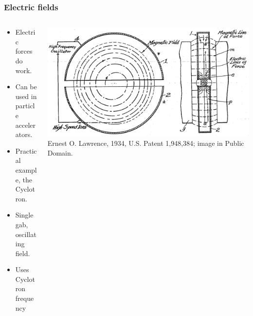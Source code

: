 \documentclass{beamer}
\begin{document}
\begin{frame}
\frametitle{Electric fields}
\begin{columns}
\begin{column}{0.5\linewidth}
\begin{itemize}
\item<1-> Electric forces do work.

\item<2-> Can be used in particle accelerators.

\item<3-> Practical example, the Cyclotron.

\item<4-> Single gab, oscillating field.

\item<4-> Uses Cyclotron frequency
\end{itemize}
\end{column}
\begin{column}{0.5\linewidth}
\includegraphics[width=\linewidth]{ Cyclotron_patent.png}
{\color{gray} Ernest O. Lawrence, 1934, U.S. Patent 1,948,384; image in Public Domain.}
\end{column}
\end{columns}
\end{frame}
\end{document}
